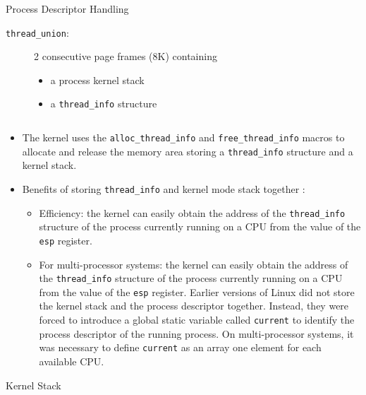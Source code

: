\begin{frame}[fragile=singleslide]{Process Descriptor Handling}
  \begin{description}
  \item[\texttt{thread\_union}:] 2 consecutive page frames (8K) containing
    \begin{itemize}
    \item a process kernel stack
    \item a \texttt{thread\_info} structure
    \end{itemize}
  \end{description}
  \begin{varwidth}{.8\textwidth}
    \inputminted{c}{../figs/thread_union.c}
  \end{varwidth}
\end{frame}

\begin{itemize}
\item The kernel uses the \texttt{alloc\_thread\_info} and \texttt{free\_thread\_info} macros
  to allocate and release the memory area storing a \texttt{thread\_info} structure and a
  kernel stack.
\item Benefits of storing \texttt{thread\_info} and kernel mode stack together :
  \begin{itemize}
  \item Efficiency: the kernel can easily obtain the address of the \texttt{thread\_info}
    structure of the process currently running on a CPU from the value of the \texttt{esp}
    register.
  \item For multi-processor systems: the kernel can easily obtain the address of the
    \texttt{thread\_info} structure of the process currently running on a CPU from the value
    of the \texttt{esp} register. Earlier versions of Linux did not store the kernel stack and the
    process descriptor together. Instead, they were forced to introduce a global static
    variable called \texttt{current} to identify the process descriptor of the running
    process. On multi-processor systems, it was necessary to define \texttt{current} as an
    array one element for each available CPU.
  \end{itemize}
\end{itemize}

\begin{frame}{Kernel Stack}
  \begin{center}
  \end{center}
\end{frame}

